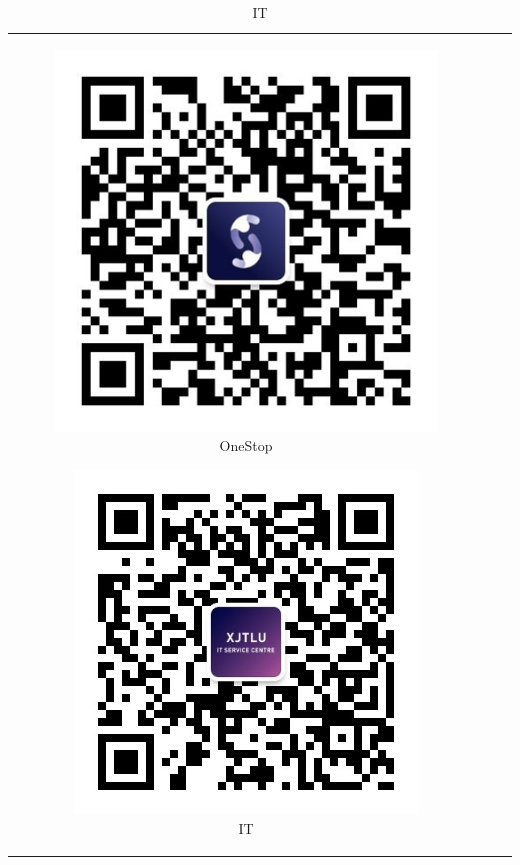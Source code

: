 \begin{table}[H]
\begin{tabular}{ccc}
\begin{subfigure}{0.25\columnwidth}
        \end{subfigure} \hfill
        \begin{subfigure}{0.25\columnwidth}
            \includegraphics[width=\linewidth]{author-folder/Kai.Wu/qrcode_student_service.jpg} \caption{OneStop}
        \end{subfigure} \hfill
        \begin{subfigure}{0.25\columnwidth}
            \includegraphics[width=\linewidth]{author-folder/Kai.Wu/qrcode_IT.jpg} \caption{IT}
        \end{subfigure} \hfill
    \end{tabular}
\end{table}


